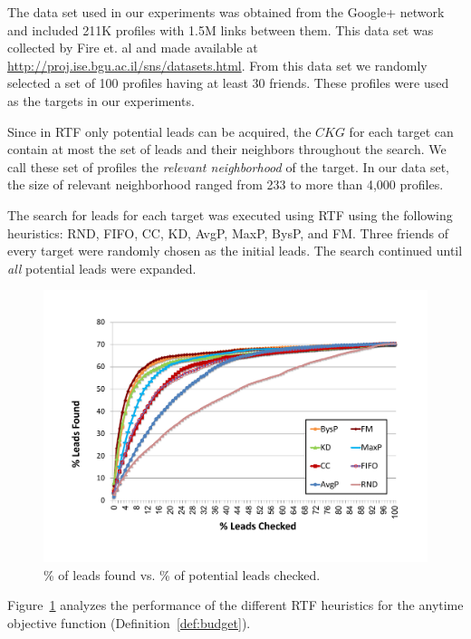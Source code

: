 \documentclass[journal]{IEEEtran}
\newcommand{\islead}[1]{{\em IsLead(#1)}}
\newcommand{\acquire}[1]{{\em Acquire(#1)}}
\begin{document}
The data set used in our experiments was obtained from the Google+ network and included 211K profiles with 1.5M links between them. This data set was collected by Fire et. al \cite{fire2011linkPrediction} and made available at \url{http://proj.ise.bgu.ac.il/sns/datasets.html}. From this data set we randomly selected  a set of 100 profiles having at least 30 friends. These profiles were used as the targets in our experiments. 


Since in RTF only potential leads can be acquired, the $CKG$ for each target can contain at most the set of leads and their neighbors throughout the search. We call these set of profiles the {\em relevant neighborhood} of the target. In our data set, the size of relevant neighborhood ranged from 233 to more than 4,000 profiles. 

The search for leads for each target was executed using RTF using the following heuristics: RND, FIFO, CC, KD, AvgP, MaxP, BysP, and FM. Three friends of every target were randomly chosen as the initial leads. The search continued until {\em all} potential leads were expanded.

 
 
\begin{figure}%
\centering
\includegraphics[width=0.5\linewidth,  trim={2.0cm 2.5cm 2.5cm 2.0cm},clip]{BTF_all.pdf}
\caption{\% of leads found vs. \% of potential leads checked.}
\label{fig:checkedVsFound}
\end{figure}
Figure~\ref{fig:checkedVsFound} analyzes the performance of the different RTF heuristics
for the anytime objective function (Definition~\ref{def:budget}). 
\end{document}
